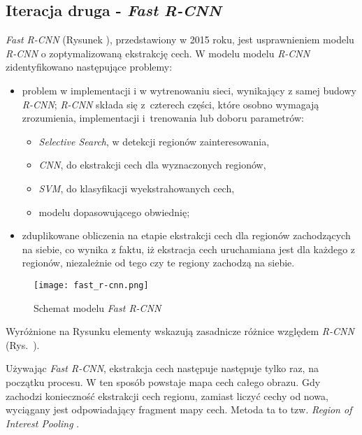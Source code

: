 \subsection{Iteracja druga - \textit{Fast R-CNN}}
\label{sec:fastrcnn}

\textit{Fast R-CNN} \cite{fast-rcnn} (Rysunek ), przedstawiony w 2015 roku, jest usprawnieniem modelu \textit{R-CNN} o zoptymalizowaną ekstrakcję cech. 
W modelu modelu \textit{R-CNN} zidentyfikowano następujące problemy:

\begin{itemize}
  \item problem w implementacji i w wytrenowaniu sieci, wynikający z samej budowy \textit{R-CNN}; \textit{R-CNN} składa się z~czterech części, które osobno wymagają zrozumienia, implementacji i~trenowania lub doboru parametrów:
		\begin{itemize}
			\item \textit{Selective Search}, w detekcji regionów zainteresowania,
			\item \textit{CNN}, do ekstrakcji cech dla wyznaczonych regionów,
			\item \textit{SVM}, do klasyfikacji wyekstrahowanych cech,
			\item modelu dopasowującego obwiednię;
		\end{itemize}
  \item zduplikowane obliczenia na etapie ekstrakcji cech dla regionów zachodzących na siebie, co wynika z faktu, iż ekstracja cech uruchamiana jest dla każdego z regionów, niezależnie od tego czy te regiony zachodzą na siebie.
\end{itemize}

\begin{figure}[h]
  \centering
  \texttt{[image: fast\_r-cnn.png]}
  \caption{Schemat modelu \textit{Fast R-CNN}}
  \label{fig:fast_r_cnn}
\end{figure}

Wyróżnione na Rysunku  elementy wskazują zasadnicze różnice względem \textit{R-CNN} (Rys.~).

Używając \textit{Fast R-CNN}, ekstrakcja cech następuje następuje tylko raz, na początku procesu.
W ten sposób powstaje mapa cech całego obrazu.
Gdy zachodzi konieczność ekstrakcji cech regionu, zamiast liczyć cechy od nowa, wyciągany jest odpowiadający fragment mapy cech.
Metoda ta to tzw. \textit{Region of Interest Pooling} \cite{fast-rcnn}.

